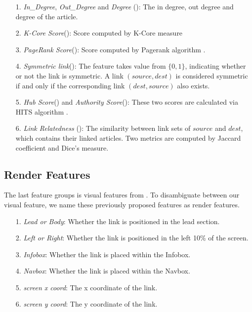 \begin{itemize}

    \item[1.] \emph{In\_Degree}, \emph{Out\_Degree} and \emph{Degree} (\cite{dimitrov2017makes}): The in degree, out degree and degree of the article.

    \item[2.] \emph{K-Core Score}(\cite{dimitrov2017makes}): Score computed by K-Core measure

    \item[3.] \emph{PageRank Score}(\cite{thruesen2016link, dimitrov2017makes}): Score computed by Pagerank algorithm \cite{brin1998anatomy}.

    \item[4.] \emph{Symmetric link}(\cite{thruesen2016link}): The feature takes value from $\{0,1\}$, indicating whether or not the link is symmetric. A link $(source, dest)$ is considered symmetric if and only if the corresponding link $(dest, source)$ also exists. 

    \item[5.] \emph{Hub Score}(\cite{thruesen2016link}) and \emph{Authority Score}(\cite{thruesen2016link}): These two scores are calculated via HITS algorithm \cite{kleinberg1998authoritative}.

    \item[6.] \emph{Link Relatedness} (\cite{thruesen2016link}): The similarity between link sets of $source$ and $dest$, which contains their linked articles. Two metrics are computed by Jaccard coefficient and Dice's measure.

\end{itemize}

\subsection{Render Features}

The last feature groups is visual features from \cite{dimitrov2017makes}. To disambiguate between our visual feature, we name these previously proposed features as render features.

\begin{itemize}
    \item[1.] \emph{Lead or Body}: Whether the link is positioned in the lead section.

    \item[2.] \emph{Left or Right}: Whether the link is positioned in the left 10\% of the screen.

    \item[3.] \emph{Infobox}: Whether the link is placed within the Infobox.

    \item[4.] \emph{Navbox}: Whether the link is placed within the Navbox.

    \item[5.] \emph{screen x coord}: The x coordinate of the link.
    
    \item[6.] \emph{screen y coord}: The y coordinate of the link.
    
\end{itemize}